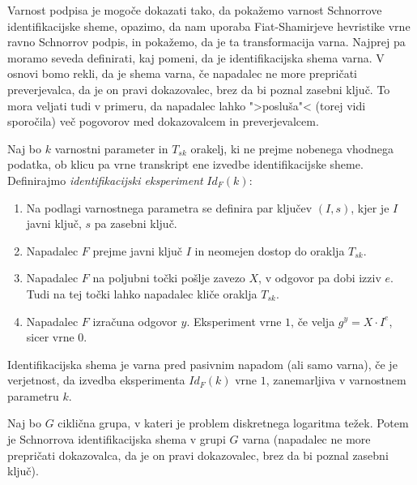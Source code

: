 \documentclass[isrm2, tisk]{fmfdelo}
\begin{document}
Varnost podpisa je mogoče dokazati tako, da pokažemo varnost Schnorrove identifikacijske sheme,
opazimo, da nam uporaba Fiat-Shamirjeve hevristike vrne ravno Schnorrov podpis, in pokažemo, da
je ta transformacija varna. Najprej pa moramo seveda definirati, kaj pomeni, da je identifikacijska
shema varna. V osnovi bomo rekli, da je shema varna, če napadalec ne more prepričati preverjevalca,
da je on pravi dokazovalec, brez da bi poznal zasebni ključ. To mora veljati tudi v primeru, da
napadalec lahko ">posluša"< (torej vidi sporočila) več pogovorov med dokazovalcem in preverjevalcem.

\begin{definicija}
\label{def:id-sec}
    Naj bo $k$ varnostni parameter in $T_{sk}$ orakelj, ki ne prejme nobenega vhodnega podatka, ob klicu
    pa vrne transkript ene izvedbe identifikacijske sheme. Definirajmo \textit{identifikacijski
    eksperiment} $Id_F(k)$:
    \begin{enumerate}
        \item Na podlagi varnostnega parametra se definira par ključev $(I, s)$, kjer je $I$
            javni ključ, $s$ pa zasebni ključ.
        \item Napadalec $F$ prejme javni ključ $I$ in neomejen dostop do oraklja $T_{sk}$.
        \item Napadalec $F$ na poljubni točki pošlje zavezo $X$, v odgovor pa dobi izziv $e$. Tudi
            na tej točki lahko napadalec kliče oraklja $T_{sk}$.
        \item Napadalec $F$ izračuna odgovor $y$. Eksperiment vrne $1$, če velja $g^y = X \cdot I^e$,
            sicer vrne $0$.
    \end{enumerate}
    Identifikacijska shema je varna pred pasivnim napadom (ali samo varna), če je verjetnost, da
    izvedba eksperimenta $Id_F(k)$ vrne $1$, zanemarljiva v varnostnem parametru $k$.
\end{definicija}

\begin{izrek}
    Naj bo $G$ ciklična grupa, v kateri je problem diskretnega logaritma težek. Potem je Schnorrova
    identifikacijska shema v grupi $G$ varna (napadalec ne more prepričati dokazovalca, da je
    on pravi dokazovalec, brez da bi poznal zasebni ključ).
\end{izrek}
\end{document}
